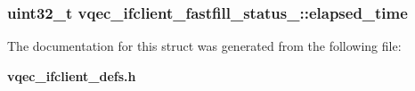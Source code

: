 \subsubsection{\setlength{\rightskip}{0pt plus 5cm}uint32\_\-t \bf{vqec\_\-ifclient\_\-fastfill\_\-status\_\-::elapsed\_\-time}}\label{structvqec__ifclient__fastfill__status___e5b58e515645fa79d139b5993f12d7d4}




The documentation for this struct was generated from the following file:\begin{CompactItemize}
\item 
\bf{vqec\_\-ifclient\_\-defs.h}\end{CompactItemize}
